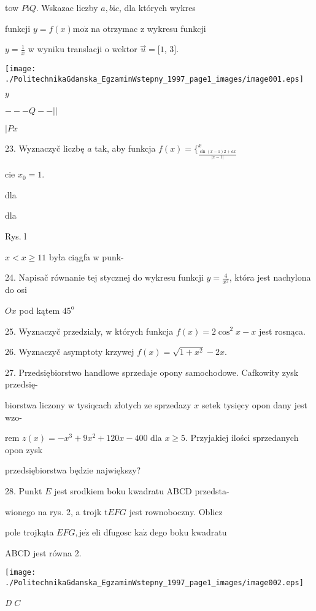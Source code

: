 \documentclass[a4paper,12pt]{article}
\begin{document}
tow $P\mathrm{i}Q$. Wskazac liczby $a, b\mathrm{i}c$, dla których wykres

funkcji $y = f(x) \mathrm{m}\mathrm{o}\dot{\mathrm{z}}$ na otrzymac z wykresu funkcji

$y=\displaystyle \frac{1}{x}$ w wyniku translacji o wektor $\vec{u}=[1$, 3$].$
\begin{center}
\texttt{[image: ./PolitechnikaGdanska\_EgzaminWstepny\_1997\_page1\_images/image001.eps]}
\end{center}
$y$

$---Q--||$

$|P x$

23. Wyznaczyč liczbę $a$ tak, aby funkcja $f(x)=\{_{\frac{\sin(x-1)2+ax}{|x-1|}}^{x}$

cie $x_{0}=1.$

dla

dla

Rys. l

$x<x\geq 11$ była ciągfa w punk-

24. Napisač równanie tej stycznej do wykresu funkcji $y=\displaystyle \frac{4}{x^{2}}$, która jest nachylona do osi

$Ox$ pod kątem $45^{\mathrm{o}}$

25. Wyznaczyč przedzialy, w których funkcja $f(x)=2\cos^{2}x-x$ jest rosnąca.

26. Wyznaczyč asymptoty krzywej $f(x)=\sqrt{1+x^{2}}-2x.$

27. Przedsiębiorstwo handlowe sprzedaje opony samochodowe. Cafkowity zysk przedsię-

biorstwa liczony w tysiqcach złotych ze sprzedazy $x$ setek tysięcy opon dany jest wzo-

rem $z(x)=-x^{3}+9x^{2}+120x-400$ dla $x\geq 5$. Przyjakiej ilości sprzedanych opon zysk

przedsiębiorstwa będzie największy?

28. Punkt $E$ jest srodkiem boku kwadratu ABCD przedsta-

wionego na rys. 2, a trojk $\mathrm{t}EFG$ jest rownoboczny. Oblicz

pole trojkąta $EFG, \mathrm{j}\mathrm{e}\dot{\mathrm{z}}$ eli dfugosc $\mathrm{k}\mathrm{a}\dot{\mathrm{z}}$ dego boku kwadratu

ABCD jest równa 2.
\begin{center}
\texttt{[image: ./PolitechnikaGdanska\_EgzaminWstepny\_1997\_page1\_images/image002.eps]}
\end{center}
{\it D} $C$
\end{document}
